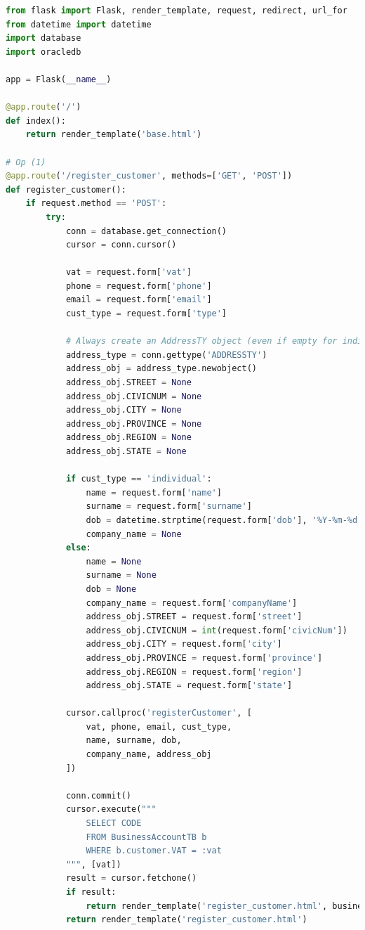 \begin{lstlisting}[language=python]
from flask import Flask, render_template, request, redirect, url_for
from datetime import datetime
import database
import oracledb

app = Flask(__name__)

@app.route('/')
def index():
    return render_template('base.html')

# Op (1)
@app.route('/register_customer', methods=['GET', 'POST'])
def register_customer():
    if request.method == 'POST':
        try:
            conn = database.get_connection()
            cursor = conn.cursor()
            
            vat = request.form['vat']
            phone = request.form['phone']
            email = request.form['email']
            cust_type = request.form['type']
            
            # Always create an AddressTY object (even if empty for individual)
            address_type = conn.gettype('ADDRESSTY')
            address_obj = address_type.newobject()
            address_obj.STREET = None
            address_obj.CIVICNUM = None
            address_obj.CITY = None
            address_obj.PROVINCE = None
            address_obj.REGION = None
            address_obj.STATE = None

            if cust_type == 'individual':
                name = request.form['name']
                surname = request.form['surname']
                dob = datetime.strptime(request.form['dob'], '%Y-%m-%d').date()
                company_name = None
            else:
                name = None
                surname = None
                dob = None
                company_name = request.form['companyName']
                address_obj.STREET = request.form['street']
                address_obj.CIVICNUM = int(request.form['civicNum'])
                address_obj.CITY = request.form['city']
                address_obj.PROVINCE = request.form['province']
                address_obj.REGION = request.form['region']
                address_obj.STATE = request.form['state']

            cursor.callproc('registerCustomer', [
                vat, phone, email, cust_type,
                name, surname, dob,
                company_name, address_obj
            ])
                    
            conn.commit()
            cursor.execute("""
                SELECT CODE 
                FROM BusinessAccountTB b 
                WHERE b.customer.VAT = :vat
            """, [vat])
            result = cursor.fetchone()
            if result:
                return render_template('register_customer.html', business_account=result[0])
            return render_template('register_customer.html')
            

\end{lstlisting}
